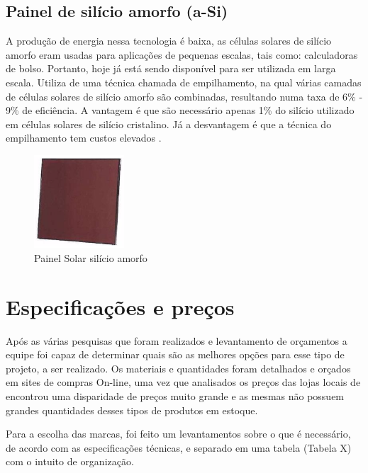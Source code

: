 \subsection{Painel de silício amorfo (a-Si)}

A produção de energia nessa tecnologia é baixa, as células solares de silício amorfo eram usadas para aplicações de pequenas escalas, tais como: calculadoras de bolso. Portanto, hoje já está sendo disponível para ser utilizada em larga escala.  Utiliza de uma técnica chamada de empilhamento, na qual várias camadas de células solares de silício amorfo são combinadas, resultando numa taxa de 6\% - 9\% de eficiência. A vantagem é que são necessário apenas 1\% do silício utilizado em células solares de silício cristalino. Já a desvantagem é que a técnica do empilhamento tem custos elevados \cite{neosolar}.

\begin{figure}[!h]
\centering
\includegraphics[width=0.3\textwidth]{figuras/marrom.png}
\caption{Painel Solar silício amorfo}
\label{fig:marrom}
\end{figure}

\section{Especificações e preços}
Após as várias pesquisas que foram realizados e levantamento de orçamentos a equipe foi capaz de determinar quais são as melhores opções para esse tipo de projeto, a ser realizado. Os materiais e quantidades foram detalhados e orçados em sites de compras On-line, uma vez que analisados os preços das lojas locais de encontrou uma disparidade de preços muito grande e as mesmas não possuem grandes quantidades desses tipos de produtos em estoque.

\par Para a escolha das marcas, foi feito um levantamentos sobre o que é necessário, de acordo com as especificações técnicas, e separado em uma tabela (Tabela X) com o intuito de organização.


